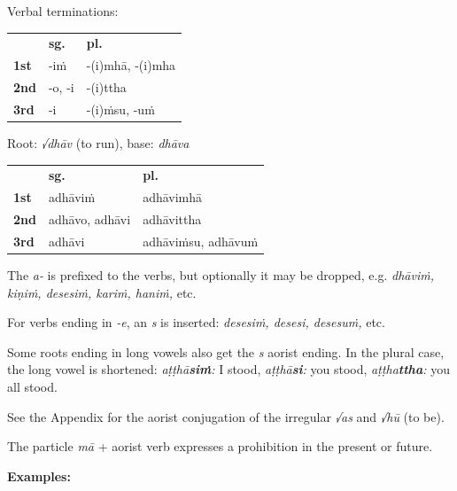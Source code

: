 \documentclass[11pt,oneside]{memoir}
\begin{document}
{\centering\par
\begin{multicols}{2}

Verbal terminations:

\begin{center}
\begin{tabular}{lll}
 & \textbf{sg.} & \textbf{pl.}\\[0pt]
\textbf{1st} & -iṁ & -(i)mhā, -(i)mha\\[0pt]
\textbf{2nd} & -o, -i & -(i)ttha\\[0pt]
\textbf{3rd} & -i & -(i)ṁsu, -uṁ\\[0pt]
\end{tabular}
\end{center}

\columnbreak

Root: \emph{√dhāv} (to run), base: \emph{dhāva}

\begin{center}
\begin{tabular}{lll}
 & \textbf{sg.} & \textbf{pl.}\\[0pt]
\textbf{1st} & adhāviṁ & adhāvimhā\\[0pt]
\textbf{2nd} & adhāvo, adhāvi & adhāvittha\\[0pt]
\textbf{3rd} & adhāvi & adhāviṁsu, adhāvuṁ\\[0pt]
\end{tabular}
\end{center}

\end{multicols}
\par}

The \emph{a-} is prefixed to the verbs, but optionally it may be dropped, e.g.
\emph{dhāviṁ, kiṇiṁ, desesiṁ, kariṁ, haniṁ,} etc.

For verbs ending in \emph{-e}, an \emph{s} is inserted: \emph{desesiṁ, desesi, desesuṁ,} etc.

Some roots ending in long vowels also get the \emph{s} aorist ending. In the plural case, the long vowel is shortened:
\emph{aṭṭhā\textbf{siṁ}:} I stood, \emph{aṭṭhā\textbf{si}:} you stood, \emph{aṭṭha\textbf{ttha}:} you all stood.

See the Appendix for the aorist conjugation of the irregular \emph{√as} and \emph{√hū} (to be).

The particle \emph{mā} + aorist verb expresses a prohibition in the present or future.

\textbf{Examples:}
\end{document}
